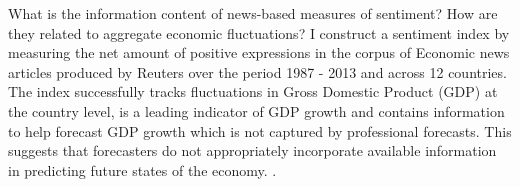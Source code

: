 What is the information content of news-based measures of sentiment? How are they related to aggregate economic fluctuations? I construct a sentiment index by measuring the net amount of positive expressions in the corpus of Economic news articles produced by Reuters over the period 1987 - 2013 and across 12 countries. The index successfully tracks fluctuations in Gross Domestic Product (GDP) at the country level, is a leading indicator of GDP growth and contains information to help forecast GDP growth which is not captured by professional forecasts. This suggests that forecasters do not appropriately incorporate available information in predicting future states of the economy. .
